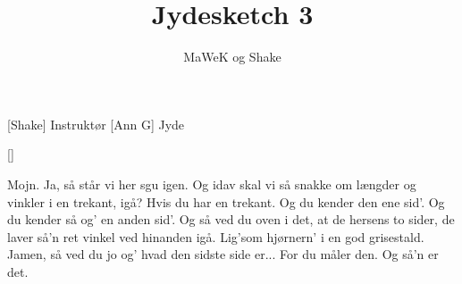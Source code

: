 \documentclass[a4paper,11pt]{article}
\title{Jydesketch 3}
\author{MaWeK og Shake}
\begin{document}
\maketitle

\begin{roles}
[Shake] Instruktør
[Ann G] Jyde
\end{roles}

\begin{props}
[]
\end{props}

\begin{sketch}
 Mojn. Ja, så står vi her sgu igen. Og idav skal vi så snakke om længder og vinkler i en trekant, igå? Hvis du har en trekant. Og du kender den ene sid’. Og du kender så og’ en anden sid’. Og så ved du oven i det, at de hersens to sider, de laver så'n ret vinkel ved hinanden igå. Lig'som hjørnern' i en god grisestald.  Jamen, så ved du jo og’ hvad den sidste side er... For du måler den. Og så’n er det.
\end{sketch}
\end{document}
